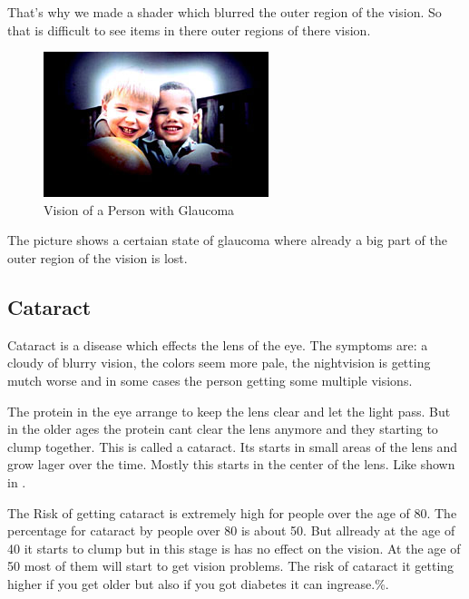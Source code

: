 \documentclass{sig-alternate-05-2015}
\begin{document}
That's why we made a shader which blurred the outer region of the vision. So that is difficult to see items in there outer regions of there vision.



\begin{figure}
    \centering
    \includegraphics[width=\columnwidth]{glaucomavision.png}
    \caption{Vision of a Person with Glaucoma}
    \label{fig:glaucoma}
\end{figure}

The picture  shows a certaian state of glaucoma where already a big part of the outer region of the vision is lost.

\subsection{Cataract}

Cataract is a disease which effects the lens of the eye. The symptoms are: a cloudy of blurry vision, the colors seem more pale, the nightvision is getting mutch worse and in some cases the person getting some multiple visions.

The protein in the eye arrange to keep the lens clear and let the light pass. But in the older ages the protein cant clear the lens anymore and they starting to clump together. This is called a cataract. Its starts in small areas of the lens and grow lager over the time. Mostly this starts in the center of the lens. Like shown in .

The Risk of getting cataract is extremely high for people over the age of 80. The percentage for cataract by people over 80 is about 50. But allready at the age of 40 it starts to clump but in this stage is has no effect on the vision. At the age of 50 most of them will start to get vision problems. The risk of cataract it getting higher if you get older but also if you got diabetes it can ingrease.\%.~\cite{cataractfacts}
\end{document}

